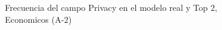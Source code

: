 \begin{figure}[H]
    \centering
    
    \caption{Frecuencia del campo Privacy en el modelo real y Top 2, Economicos (A-2)}
    \label{frecuency-Privacy-top2}
\end{figure}
